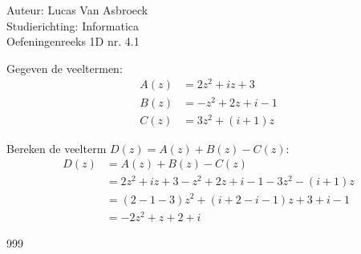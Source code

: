 \documentclass[a4paper]{article}
\begin{document}
\noindent \large Auteur: Lucas Van Asbroeck \\
\noindent \large Studierichting: Informatica\\
\noindent \large Oefeningenreeks 1D nr. 4.1\\

\medskip

\normalsize

Gegeven de veeltermen:
\begin{align*}
	A(z) &= 2z^2 + iz + 3\\
	B(z) &= -z^2 + 2z + i - 1\\
	C(z) &= 3z^2 + (i + 1)z
\end{align*}

Bereken de veelterm $D(z) = A(z) + B(z) - C(z)$:
\begin{align*}
	D(z) &= A(z) + B(z) - C(z) \\
	&= 2z^2 + iz + 3 -z^2 + 2z + i - 1 - 3z^2 - (i + 1)z \\
	&= (2 - 1 - 3)z^2 + (i + 2 - i - 1)z + 3 + i - 1 \\
	&= -2z^2 + z + 2 + i
\end{align*}


\begin{thebibliography}{999}
\end{thebibliography}
\end{document}
